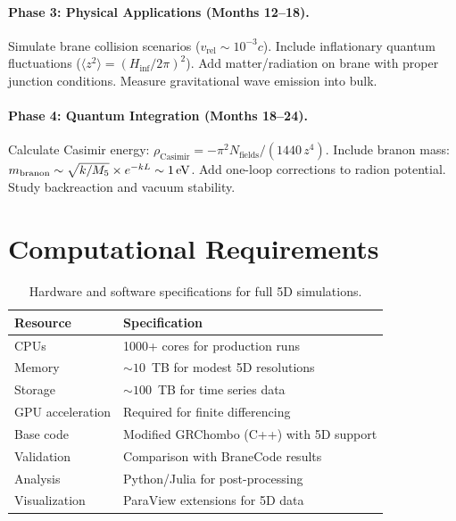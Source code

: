 \paragraph{Phase 3: Physical Applications (Months 12--18).}
Simulate brane collision scenarios ($v_\text{rel} \sim 10^{-3}c$). Include inflationary quantum fluctuations ($\langle z^2\rangle = (H_\text{inf}/2\pi)^2$). Add matter/radiation on brane with proper junction conditions. Measure gravitational wave emission into bulk.

\paragraph{Phase 4: Quantum Integration (Months 18--24).}
Calculate Casimir energy: $\rho_\text{Casimir} = -\pi^2 N_\text{fields}/(1440\,z^4)$. Include branon mass: $m_\text{branon} \sim \sqrt{k/M_5} \times e^{-kL} \sim 1\,\text{eV}$. Add one-loop corrections to radion potential. Study backreaction and vacuum stability.

\section{Computational Requirements}
\label{sec:compute_reqs}

\begin{table}[h]
\centering
\caption{Hardware and software specifications for full 5D simulations.}
\begin{tabular}{@{}ll@{}}
\toprule
\textbf{Resource} & \textbf{Specification} \\
\midrule
CPUs & 1000+ cores for production runs \\
Memory & $\sim 10$~TB for modest 5D resolutions \\
Storage & $\sim 100$~TB for time series data \\
GPU acceleration & Required for finite differencing \\
\midrule
Base code & Modified GRChombo (C++) with 5D support \\
Validation & Comparison with BraneCode results \\
Analysis & Python/Julia for post-processing \\
Visualization & ParaView extensions for 5D data \\
\bottomrule
\end{tabular}
\end{table}

